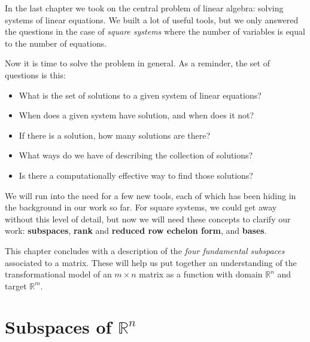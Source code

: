 \documentclass[10pt,]{book}
\newcommand{\terminology}[1]{\textbf{#1}}
\theoremstyle{plain}
\numberwithin{equation}{section}
\begin{document}
      In the last chapter we took on the central problem of linear algebra: solving
      systems of linear equations. We built a lot of useful tools, but we only
      answered the questions in the case of \emph{square systems} where the
      number of variables is equal to the number of equations.
\par

      Now it is time to solve the problem in general. As a reminder, the set of
      questions is this:
\begin{itemize}
\item{}
        What is the set of solutions to a given system of linear equations?
      \item{}
        When does a given system have solution, and when does it not?
      \item{}
        If there is a solution, how many solutions are there?
      \item{}
        What ways do we have of describing the collection of solutions?
      \item{}
        Is there a computationally effective way to find those solutions?
      \end{itemize}
\par

      We will run into the need for a few new tools, each of which has been
      hiding in the background in our work so far. For square systems, we could
      get away without this level of detail, but now we will need these concepts
      to clarify our work: \terminology{subspaces}, \terminology{rank} and
      \terminology{reduced row echelon form}, and \terminology{bases}.
\par

      This chapter concludes with a description of the \emph{four fundamental subspaces}
      associated to a matrix. These will help us put together an understanding of
      the transformational model of an \(m\times n\) matrix as a function with
      domain \(\mathbb{R}^n\) and target \(\mathbb{R}^m\).
\typeout{************************************************}
\typeout{************************************************}
\section[Subspaces of \(\mathbb{R}^n\)]{Subspaces of \(\mathbb{R}^n\)}\label{vector-spaces}
\typeout{************************************************}
\typeout{************************************************}
\end{document}
